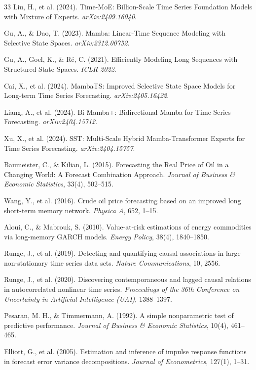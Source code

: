 \documentclass[3p,times]{elsarticle}
\begin{document}
\begin{thebibliography}{33}
Liu, H., et al. (2024). Time-MoE: Billion-Scale Time Series Foundation Models with Mixture of Experts. \textit{arXiv:2409.16040}.

Gu, A., \& Dao, T. (2023). Mamba: Linear-Time Sequence Modeling with Selective State Spaces. \textit{arXiv:2312.00752}.

Gu, A., Goel, K., \& R\'e, C. (2021). Efficiently Modeling Long Sequences with Structured State Spaces. \textit{ICLR 2022}.

Cai, X., et al. (2024). MambaTS: Improved Selective State Space Models for Long-term Time Series Forecasting. \textit{arXiv:2405.16422}.

Liang, A., et al. (2024). Bi-Mamba+: Bidirectional Mamba for Time Series Forecasting. \textit{arXiv:2404.15712}.

Xu, X., et al. (2024). SST: Multi-Scale Hybrid Mamba-Transformer Experts for Time Series Forecasting. \textit{arXiv:2404.15757}.

Baumeister, C., \& Kilian, L. (2015). Forecasting the Real Price of Oil in a Changing World: A Forecast Combination Approach. \textit{Journal of Business \& Economic Statistics}, 33(4), 502--515.

Wang, Y., et al. (2016). Crude oil price forecasting based on an improved long short-term memory network. \textit{Physica A}, 652, 1--15.

Aloui, C., \& Mabrouk, S. (2010). Value-at-risk estimations of energy commodities via long-memory GARCH models. \textit{Energy Policy}, 38(4), 1840--1850.

Runge, J., et al. (2019). Detecting and quantifying causal associations in large non-stationary time series data sets. \textit{Nature Communications}, 10, 2556.

Runge, J., et al. (2020). Discovering contemporaneous and lagged causal relations in autocorrelated nonlinear time series. \textit{Proceedings of the 36th Conference on Uncertainty in Artificial Intelligence (UAI)}, 1388--1397.

Pesaran, M. H., \& Timmermann, A. (1992). A simple nonparametric test of predictive performance. \textit{Journal of Business \& Economic Statistics}, 10(4), 461--465.

Elliott, G., et al. (2005). Estimation and inference of impulse response functions in forecast error variance decompositions. \textit{Journal of Econometrics}, 127(1), 1--31.


\end{thebibliography}
\end{document}
